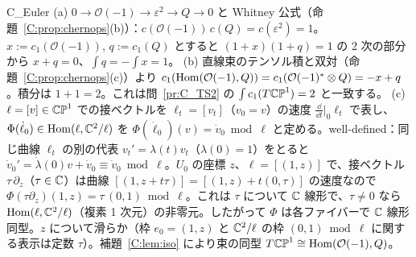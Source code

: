 \begin{soll}{C_Euler}
(a) $0\to\mathcal O(-1)\to\varepsilon^2\to Q\to0$ と Whitney 公式（命題~\ref{C:prop:chernops}(b)）：$c(\mathcal O(-1))\,c(Q)=c(\varepsilon^2)=1$。$x:=c_1(\mathcal O(-1))$, $q:=c_1(Q)$ とすると $(1+x)(1+q)=1$ の 2 次の部分から $x+q=0$、$\int q=-\int x=1$。
(b) 直線束のテンソル積と双対（命題~\ref{C:prop:chernops}(c)）より $c_1(\mathrm{Hom}(\mathcal O(-1),Q))=c_1(\mathcal O(-1)^*\otimes Q)=-x+q$。積分は $1+1=2$。これは問~\ref{pr:C_TS2} の $\int c_1(T\mathbb{CP}^1)=2$ と一致する。
(c) $\ell=[v]\in\mathbb{CP}^1$ での接ベクトルを $\ell_t=[v_t]$（$v_0=v$）の速度 $\frac{\dd}{\dd t}|_0\ell_t$ で表し、$\Phi(\dot\ell_0)\in\mathrm{Hom}(\ell,\mathbb C^2/\ell)$ を $\Phi(\dot\ell_0)(v)=\dot v_0\bmod\ell$ と定める。well-defined：同じ曲線 $\ell_t$ の別の代表 $v_t'=\lambda(t)v_t$（$\lambda(0)=1$）をとると $\dot v_0'=\dot\lambda(0)v+\dot v_0\equiv\dot v_0\bmod\ell$。$U_0$ の座標 $z$、$\ell=[(1,z)]$ で、接ベクトル $\tau\,\partial_z$（$\tau\in\mathbb C$）は曲線 $[(1,z+t\tau)]=[(1,z)+t(0,\tau)]$ の速度なので $\Phi(\tau\partial_z)(1,z)=\tau\,(0,1)\bmod\ell$。これは $\tau$ について $\mathbb C$ 線形で、$\tau\ne0$ なら $\mathrm{Hom}(\ell,\mathbb C^2/\ell)$（複素 1 次元）の非零元。したがって $\Phi$ は各ファイバーで $\mathbb C$ 線形同型。$z$ について滑らか（枠 $e_0=(1,z)$ と $\mathbb C^2/\ell$ の枠 $(0,1)\bmod\ell$ に関する表示は定数 $\tau$）。補題~\ref{C:lem:iso} により束の同型 $T\mathbb{CP}^1\cong\mathrm{Hom}(\mathcal O(-1),Q)$。
\end{soll}
